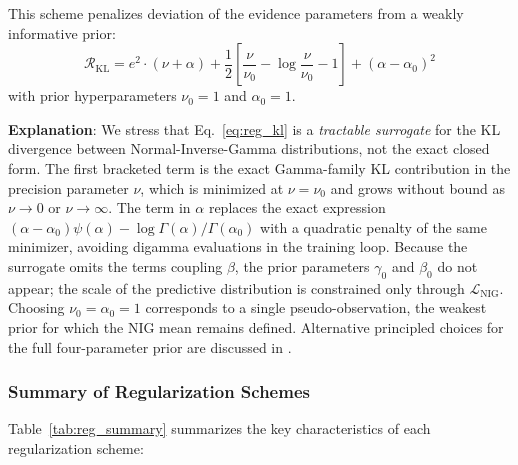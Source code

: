 This scheme penalizes deviation of the evidence parameters from a weakly informative prior:
\begin{equation}
    \mathcal{R}_{\text{KL}} = e^2 \cdot (\nu + \alpha)
    + \frac{1}{2}\left[\frac{\nu}{\nu_0} - \log\frac{\nu}{\nu_0} - 1\right]
    + \left(\alpha - \alpha_0\right)^2
    \label{eq:reg_kl}
\end{equation}
with prior hyperparameters $\nu_0 = 1$ and $\alpha_0 = 1$.

\textbf{Explanation}: We stress that Eq.~\eqref{eq:reg_kl} is a \emph{tractable surrogate} for the KL divergence
between Normal-Inverse-Gamma distributions, not the exact closed form. The first bracketed term is the exact
Gamma-family KL contribution in the precision parameter $\nu$, which is minimized at $\nu = \nu_0$ and grows
without bound as $\nu \to 0$ or $\nu \to \infty$. The term in $\alpha$ replaces the exact expression
$(\alpha - \alpha_0)\psi(\alpha) - \log\Gamma(\alpha)/\Gamma(\alpha_0)$ with a quadratic penalty of the same
minimizer, avoiding digamma evaluations in the training loop. Because the surrogate omits the terms coupling
$\beta$, the prior parameters $\gamma_0$ and $\beta_0$ do not appear; the scale of the predictive distribution is
constrained only through $\mathcal{L}_{\text{NIG}}$. Choosing $\nu_0 = \alpha_0 = 1$ corresponds to a single
pseudo-observation, the weakest prior for which the NIG mean remains defined. Alternative principled choices for
the full four-parameter prior are discussed in \cite{tan2025evidential}.

\subsubsection{Summary of Regularization Schemes}

Table~\ref{tab:reg_summary} summarizes the key characteristics of each regularization scheme:

\begin{table}[h]
\centering
\caption{Comparison of regularization schemes for Evidential-FNO.}
\label{tab:reg_summary}
\end{table}

